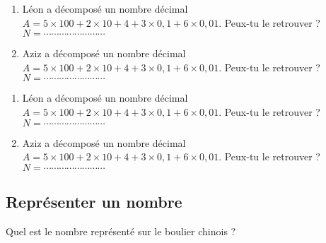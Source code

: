 
\begin{enumerate}
\item Léon a décomposé un nombre décimal  $A = 5\times 100 + 2\times 10 + 4 + 3\times 0,1 +  6\times 0,01 $. Peux-tu le retrouver ?
$N = \cdots\cdots\cdots\cdots\cdots\cdots\cdots\cdots $

\item Aziz a décomposé un nombre décimal  $A = 5\times 100 + 2\times 10 + 4 + 3\times 0,1 +  6\times 0,01 $. Peux-tu le retrouver ?
$N = \cdots\cdots\cdots\cdots\cdots\cdots\cdots\cdots $

\end{enumerate}


\begin{enumerate}
\item Léon a décomposé un nombre décimal  $A = 5\times 100 + 2\times 10 + 4 + 3\times 0,1 +  6\times 0,01 $. Peux-tu le retrouver ?
$N = \cdots\cdots\cdots\cdots\cdots\cdots\cdots\cdots $

\item Aziz a décomposé un nombre décimal  $A = 5\times 100 + 2\times 10 + 4 + 3\times 0,1 +  6\times 0,01 $. Peux-tu le retrouver ?
$N = \cdots\cdots\cdots\cdots\cdots\cdots\cdots\cdots $

\end{enumerate}




\subsection{Représenter un nombre}



Quel est le nombre représenté sur le boulier chinois ?


